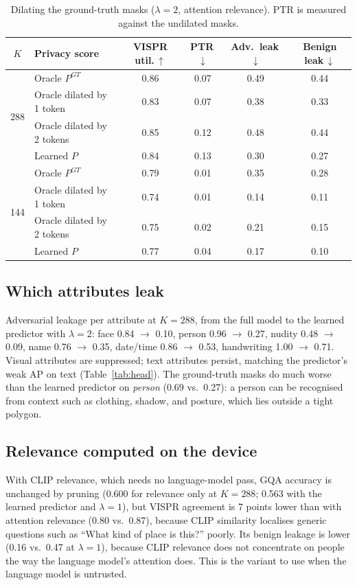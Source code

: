 \documentclass{article}
\begin{document}
\begin{table}[h]
\centering\small
\caption{Dilating the ground-truth masks ($\lambda=2$, attention relevance). PTR is measured against the undilated masks.}
\label{tab:dil}
\begin{tabular}{@{}clcccc@{}}
\toprule
$K$ & Privacy score & VISPR util.\,$\uparrow$ & PTR\,$\downarrow$ & Adv.\ leak\,$\downarrow$ & Benign leak\,$\downarrow$ \\
\midrule
\multirow{4}{*}{288} & Oracle $P^{GT}$ & 0.86 & 0.07 & 0.49 & 0.44 \\
 & Oracle dilated by 1 token & 0.83 & 0.07 & 0.38 & 0.33 \\
 & Oracle dilated by 2 tokens & 0.85 & 0.12 & 0.48 & 0.44 \\
 & Learned $P$ & 0.84 & 0.13 & 0.30 & 0.27 \\
\midrule
\multirow{4}{*}{144} & Oracle $P^{GT}$ & 0.79 & 0.01 & 0.35 & 0.28 \\
 & Oracle dilated by 1 token & 0.74 & 0.01 & 0.14 & 0.11 \\
 & Oracle dilated by 2 tokens & 0.75 & 0.02 & 0.21 & 0.15 \\
 & Learned $P$ & 0.77 & 0.04 & 0.17 & 0.10 \\
\bottomrule
\end{tabular}
\end{table}

\subsection{Which attributes leak}
Adversarial leakage per attribute at $K=288$, from the full model to the learned predictor with $\lambda=2$: face 0.84 $\to$ 0.10, person 0.96 $\to$ 0.27,
nudity 0.48 $\to$ 0.09, name 0.76 $\to$ 0.35, date/time 0.86 $\to$ 0.53, handwriting 1.00 $\to$ 0.71. Visual attributes are suppressed; text attributes persist,
matching the predictor's weak AP on text (Table~\ref{tab:head}). The ground-truth masks do much worse than the learned predictor on \emph{person}
(0.69 vs.\ 0.27): a person can be recognised from context such as clothing, shadow, and posture, which lies outside a tight polygon.

\subsection{Relevance computed on the device}
With CLIP relevance, which needs no language-model pass, GQA accuracy is unchanged by pruning (0.600 for relevance only at $K=288$; 0.563 with the learned predictor
and $\lambda=1$), but VISPR agreement is 7 points lower than with attention relevance (0.80 vs.\ 0.87), because CLIP similarity localises generic questions such as
``What kind of place is this?'' poorly. Its benign leakage is lower (0.16 vs.\ 0.47 at $\lambda=1$), because CLIP relevance does not concentrate on people the way
the language model's attention does. This is the variant to use when the language model is untrusted.
\end{document}

